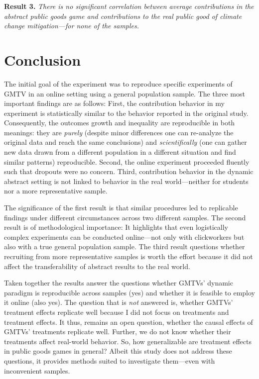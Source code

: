 \documentclass[
  authoryear,
  review,
  3p,
  onecolumn]{elsarticle}
\begin{document}
\textbf{Result 3.} \emph{There is no significant correlation between
average contributions in the abstract public goods game and
contributions to the real public good of climate change mitigation---for
none of the samples.}

\hypertarget{sec-conclusion}{%
\section{Conclusion}\label{sec-conclusion}}

The initial goal of the experiment was to reproduce specific experiments
of GMTV in an online setting using a general population sample. The
three most important findings are as follows: First, the contribution
behavior in my experiment is statistically similar to the behavior
reported in the original study. Consequently, the outcomes growth and
inequality are reproducible in both meanings: they are \emph{purely}
(despite minor differences one can re-analyze the original data and
reach the same conclusions) and \emph{scientifically} (one can gather
new data drawn from a different population in a different situation and
find similar patterns) reproducible. Second, the online experiment
proceeded fluently such that dropouts were no concern. Third,
contribution behavior in the dynamic abstract setting is not linked to
behavior in the real world---neither for students nor a more
representative sample.

The significance of the first result is that similar procedures led to
replicable findings under different circumstances across two different
samples. The second result is of methodological importance: It
highlights that even logistically complex experiments can be conducted
online---not only with clickworkers but also with a true general
population sample. The third result questions whether recruiting from
more representative samples is worth the effort because it did not
affect the transferability of abstract results to the real world.

Taken together the results answer the questions whether GMTVs' dynamic
paradigm is reproducible across samples (yes) and whether it is feasible
to employ it online (also yes). The question that is \emph{not} answered
is, whether GMTVs' treatment effects replicate well because I did not
focus on treatments and treatment effects. It thus, remains an open
question, whether the causal effects of GMTVs' treatments replicate
well. Further, we do not know whether their treatments affect real-world
behavior. So, how generalizable are treatment effects in public goods
games in general? Albeit this study does not address these questions, it
provides methods suited to investigate them---even with inconvenient
samples.
\end{document}
